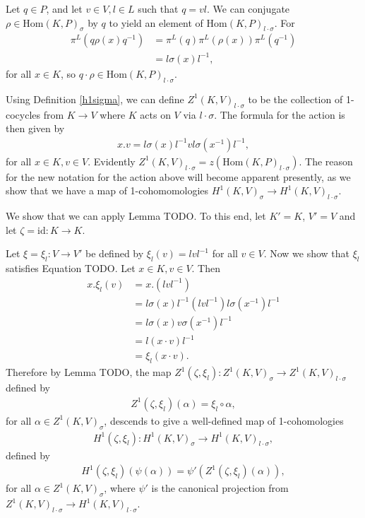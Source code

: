 Let $q \in P$, and let $v \in V, l \in L$ such that $q = vl$. We can conjugate $\rho \in \mathrm{Hom}(K, P)_\sigma$ by $q$ to yield an element of $\mathrm{Hom}(K, P)_{l \cdot \sigma}$. For
\begin{align*}%
\pi^L\left(q \rho(x) q^{-1}\right)%
&= \pi^L\left(q\right) \pi^L\left(\rho(x)\right) \pi^L\left(q^{-1}\right) \\
&= l \sigma(x) l^{-1},
\end{align*}
for all $x \in K$, so $q \cdot \rho \in \mathrm{Hom}(K, P)_{l\cdot \sigma}$.

Using Definition \ref{h1sigma}, we can define $Z^1(K, V)_{l \cdot \sigma}$ to be the collection of 1-cocycles from $K \rightarrow V$ where $K$ acts on $V$ via $l \cdot \sigma$. The formula for the action is then given by
\begin{align*}
	x.v = l \sigma(x) l^{-1} v l \sigma(x^{-1}) l^{-1},
\end{align*}
for all $x \in K, v \in V$. Evidently $Z^1(K, V)_{l \cdot \sigma} = z\left(\mathrm{Hom}(K, P)_{l \cdot \sigma}\right)$. The reason for the new notation for the action above will become apparent presently, as we show that we have a map of 1-cohomomologies $H^1(K, V)_\sigma \rightarrow H^1(K, V)_{l \cdot \sigma}$.

	We show that we can apply Lemma TODO. To this end, let $K' = K$, $V' = V$ and let $\zeta = \mathrm{id}:K \rightarrow K$.

Let $\xi = \xi_l: V \rightarrow V'$ be defined by	$\xi_l(v) = lvl^{-1}$ for all $v \in V$. Now we show that $\xi_l$ satisfies Equation TODO. Let $x \in K, v \in V$. Then
	\begin{align*}
		x . \xi_l(v) &= x . \left(lvl^{-1}\right) \\
		&= l\sigma(x)l^{-1} \left(lvl^{-1}\right) l\sigma(x^{-1})l^{-1} \\
		&= l\sigma(x)v\sigma(x^{-1})l^{-1} \\
		&= l\left(x \cdot v \right)l^{-1} \\
		&= \xi_l \left(x \cdot v \right).
	\end{align*}
	Therefore by Lemma TODO, the map $Z^1(\zeta, \xi_l):Z^1(K, V)_\sigma \rightarrow Z^1(K, V)_{l \cdot \sigma}$ defined by 
	\begin{align*}
		Z^1(\zeta, \xi_l)(\alpha) = \xi_l \circ \alpha,
	\end{align*}
	for all $\alpha \in Z^1(K, V)_\sigma$,
	descends to give a well-defined map of 1-cohomologies
	\begin{align*}
		H^1(\zeta, \xi_l):H^1(K, V)_\sigma \rightarrow H^1(K, V)_{l \cdot \sigma},
	\end{align*}
	defined by
	\begin{align*}
		H^1(\zeta, \xi_l)\left(\psi(\alpha)\right) = \psi'\left(Z^1(\zeta, \xi_l)(\alpha)\right),
	\end{align*}
	for all $\alpha \in Z^1(K, V)_\sigma$,
	where $\psi'$ is the canonical projection from $Z^1(K, V)_{l \cdot \sigma} \rightarrow H^1(K, V)_{l \cdot \sigma}$.

